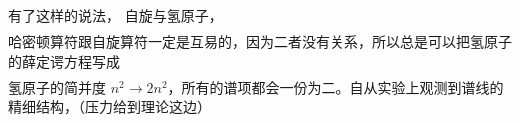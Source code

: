 有了这样的说法，
自旋与氢原子，
\begin{align}
    []
\end{align}
哈密顿算符跟自旋算符一定是互易的，因为二者没有关系，所以总是可以把氢原子的薛定谔方程写成
\begin{align}
    []
\end{align}
氢原子的简并度 $n^2 \rightarrow 2n^2$，所有的谱项都会一份为二。自从实验上观测到谱线的精细结构，（压力给到理论这边）

